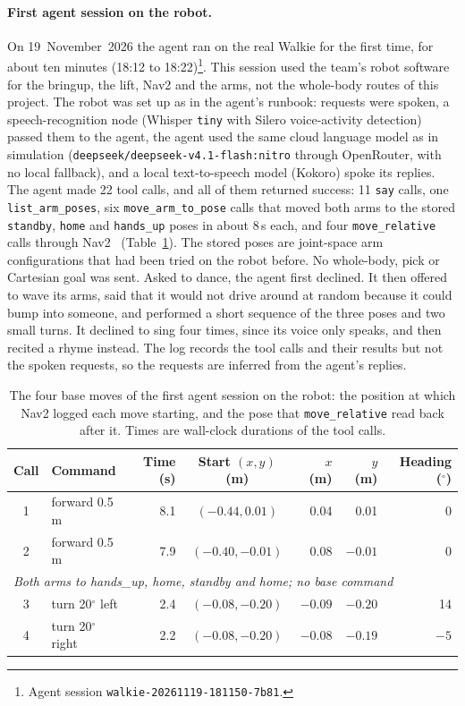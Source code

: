 \documentclass[12pt,a4paper]{article}
\begin{document}
\paragraph{First agent session on the robot.}
On 19~November~2026 the agent ran on the real Walkie for the first time, for about ten minutes
(18:12 to 18:22)\footnote{Agent session \texttt{walkie-20261119-181150-7b81}.}. This session used the team's robot
software for the bringup, the lift, Nav2 and the arms, not the whole-body routes of this project. The
robot was set up as in the agent's runbook: requests were spoken, a speech-recognition node (Whisper
\texttt{tiny} with Silero voice-activity detection) passed them to the agent, the agent used the same
cloud language model as in simulation (\nolinkurl{deepseek/deepseek-v4.1-flash:nitro} through
OpenRouter, with no local fallback), and a local text-to-speech model (Kokoro) spoke its replies.
The agent made 22 tool calls, and all of them returned success: 11 \texttt{say} calls, one
\texttt{list\_arm\_poses}, six \texttt{move\_arm\_to\_pose} calls that moved both arms to the stored
\texttt{standby}, \texttt{home} and \texttt{hands\_up} poses in about 8\,s each, and four
\texttt{move\_relative} calls through Nav2~\cite{nav2} (Table~\ref{tab:robot_session}). The stored
poses are joint-space arm configurations that had been tried on the robot before. No whole-body,
pick or Cartesian goal was sent. Asked to dance, the agent first declined. It then offered to wave
its arms, said that it would not drive around at random because it could bump into someone, and
performed a short sequence of the three poses and two small turns. It declined to sing four times,
since its voice only speaks, and then recited a rhyme instead. The log records the tool calls and
their results but not the spoken requests, so the requests are inferred from the agent's replies.

\begin{table}[H]
    \centering
    \small
    \renewcommand{\arraystretch}{1.15}
    \begin{tabular}{c l r c r r r}
        \toprule
        Call & Command & Time (s) & Start $(x, y)$ (m) & $x$ (m) & $y$ (m) & Heading ($^\circ$) \\
        \midrule
        1 & forward 0.5\,m & 8.1 & $(-0.44, 0.01)$ & 0.04 & 0.01 & 0 \\
        2 & forward 0.5\,m & 7.9 & $(-0.40, -0.01)$ & 0.08 & $-0.01$ & 0 \\
        \multicolumn{7}{l}{\textit{Both arms to hands\_up, home, standby and home; no base command}} \\
        3 & turn 20$^\circ$ left & 2.4 & $(-0.08, -0.20)$ & $-0.09$ & $-0.20$ & 14 \\
        4 & turn 20$^\circ$ right & 2.2 & $(-0.08, -0.20)$ & $-0.08$ & $-0.19$ & $-5$ \\
        \bottomrule
    \end{tabular}
    \caption{\small{The four base moves of the first agent session on the robot: the position at
    which Nav2 logged each move starting, and the pose that \texttt{move\_relative} read back after
    it. Times are wall-clock durations of the tool calls.}}
    \label{tab:robot_session}
\end{table}
\end{document}
